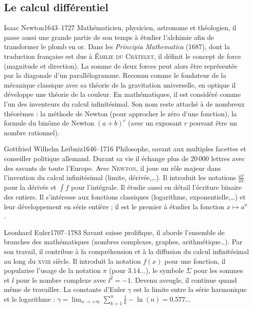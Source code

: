 \documentclass[10pt,class=article,crop=false]{standalone}
\begin{document}
\begin{multicols}{2}
\subsection{Le calcul différentiel}

\begin{biographie}{Isaac Newton}{1643--1727}
Mathématicien, physicien, astronome et théologien, il passe aussi une grande partie de son temps à étudier l'alchimie afin de transformer le plomb en or.
Dans les \emph{Principia Mathematica} (1687), dont la traduction française est due à \textsc{Émilie du Châtelet}, il définit le concept de force (magnitude et direction). La somme de deux forces peut alors être représentée par la diagonale d’un parallélogramme. Reconnu comme le fondateur de la mécanique classique avec sa théorie de la gravitation universelle, en optique il développe une théorie de la couleur.
En mathématiques, il est considéré comme l’un des inventeurs du calcul infinitésimal. 
Son nom reste attaché à de nombreux théorèmes : la méthode de Newton (pour approcher le zéro d'une fonction), la formule du binôme de Newton $(a+b)^r$ (avec un exposant $r$ pouvant être un nombre rationnel).
\end{biographie}


\begin{biographie}{Gottfried Wilhelm Leibniz}{1646--1716}
Philosophe, savant aux multiples facettes et conseiller politique allemand. 
Durant sa vie il échange plus de $20\,000$ lettres avec des savants de toute l'Europe.
Avec \textsc{Newton}, il joue un rôle majeur dans l’invention du calcul infinitésimal (limite, dérivée,\ldots). Il introduit les notations $\frac{\dd f}{\dd x}$ pour la dérivée et $\int f$ pour l'intégrale. Il étudie aussi en détail l'écriture binaire des entiers.
Il s'intéresse aux fonctions classiques (logarithme, exponentielle,\ldots) et leur développement en série entière ; il est le premier à étudier la fonction $x \mapsto a^x$.
\end{biographie}


\begin{biographie}{Leonhard Euler}{1707--1783}
Savant suisse prolifique, il aborde l’ensemble de branches des mathématiques (nombres complexes, graphes, arithmétique\ldots). Par son travail, il contribue à la compréhension et à la diffusion du calcul infinitésimal au long du \textsc{xviii}\ieme{} siècle. Il introduit la notation $f(x)$ pour une fonction, il popularise l'usage de la notation $\pi$ (pour $3.14\ldots$),
le symbole $\Sigma$ pour les sommes et $\ii$ pour le nombre complexe avec $\ii^2=-1$. Devenu aveugle, il continue quand même de travailler.
La constante d'Euler $\gamma$ est la limite entre la série harmonique et le logarithme : $\gamma = \lim_{n\to+\infty} \sum_{k=1}^{n}{\frac1k} - \ln(n) = 0.577\ldots$
\end{biographie}



\end{multicols}
\end{document}
